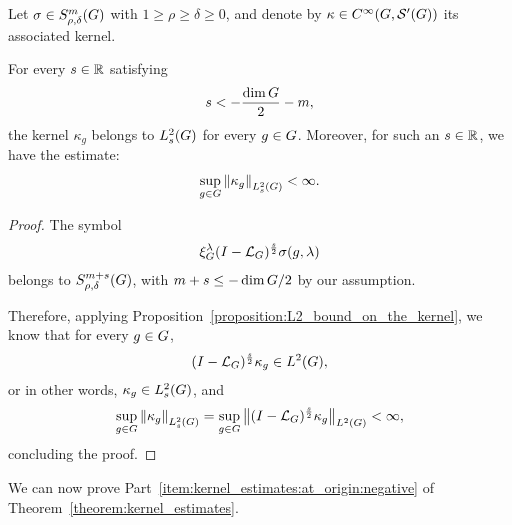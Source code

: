 \begin{corollary}
\label{corollary:Sobolev_estimates_on_the_kernel}
    Let $\sigma \in \SymbolClass m {\rho,\delta}$ with $1 \geq \rho \geq \delta \geq 0$,
    and denote by $\kappa \in \SmoothFunctions {\Group, \TemperedDistributions \Group}$ its associated kernel.

    For every $s \in \R$ satisfying
    \begin{align*}
        s < -\frac{\dim \Group} 2 - m,
    \end{align*}
    the kernel $\kappa_g$ belongs to $\Sobolev s$ for every $g \in \Group$.
    Moreover, for such an $s \in \R$, we have the estimate:
    \begin{align*}
        \sup_{g \in \Group} \norm [\Sobolev s] {\kappa_g} < \infty.
    \end{align*}
\end{corollary}
\begin{proof}
    The symbol
    \begin{align*}
        \Rep \lambda \BesselPotential s \sigma(g, \lambda)
    \end{align*}
    belongs to $\SymbolClass {m + s} {\rho, \delta}$,
    with $m + s \leq -\dim \Group/2$ by our assumption.

    Therefore, applying Proposition~\ref{proposition:L2_bound_on_the_kernel},
    we know that for every $g \in \Group$,
    \begin{align*}
        \BesselPotential s \kappa_g \in \Lebesgue 2 \Group,
    \end{align*}
    or in other words, $\kappa_g \in \Sobolev s$, and
    \begin{align*}
        \sup_{g \in \Group} \norm [\Sobolev s] {\kappa_g}
        = \sup_{g \in \Group} \norm [\Lebesgue 2 \Group] {\BesselPotential s \kappa_g}
        < \infty,
    \end{align*}
    concluding the proof.
\end{proof}

We can now prove Part~\ref{item:kernel_estimates:at_origin:negative} of Theorem~\ref{theorem:kernel_estimates}.

